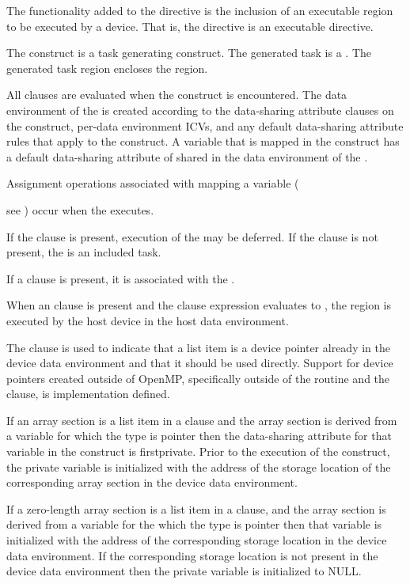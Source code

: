 {{The functionality added to the  directive is the inclusion of an executable region to be executed by a device. That is, the  directive is an executable directive.

The  construct is a task generating construct.  The generated task is a .  The generated task region encloses the  region.

All clauses are evaluated when the  construct is encountered.  The data environment of the  is created according to the data-sharing attribute clauses on the  construct, per-data environment ICVs, and any default data-sharing attribute rules that apply to the  construct.  A variable that is mapped in the  construct has a default data-sharing attribute of shared in the data environment of the .

Assignment operations associated with mapping a variable ({see ) occur when the  executes.

If the  clause is present, execution of the  may be deferred.  If the  clause is not present, the  is an included task.

If a  clause is present, it is associated with the .

When an  clause is present and the  clause expression evaluates to , the  region is executed by the host device in the host data environment.

The  clause is used to indicate that a list item is a device
pointer already in the device data environment and that it should be used
directly.  Support for device pointers created outside of OpenMP, specifically
outside of the  routine and the  clause,
is implementation defined.

\ccppspecificstart
If an array section is a list item in a  clause and the array section is derived from a variable for which the type is pointer then the data-sharing attribute for that variable in the construct is firstprivate.  Prior to the execution of the construct, the private variable is initialized with the address of the storage location of the corresponding array section in the device data environment.

If a zero-length array section is a list item in a  clause, and the array section is derived from a variable for the which the type is pointer then that variable is initialized with the address of the corresponding storage location in the device data environment.  If the corresponding storage location is not present in the device data environment then the private variable is initialized to NULL.  
\ccppspecificend

}}}
